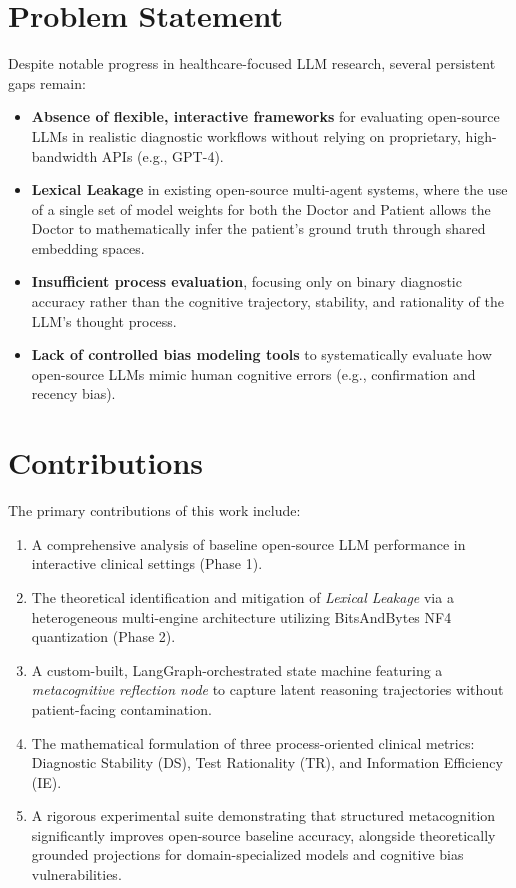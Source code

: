 \documentclass[12pt, a4paper, twoside]{report}
\begin{document}
\section{Problem Statement}
Despite notable progress in healthcare-focused LLM research, several persistent gaps remain:
\begin{itemize}
    \item \textbf{Absence of flexible, interactive frameworks} for evaluating open-source LLMs in realistic diagnostic workflows without relying on proprietary, high-bandwidth APIs (e.g., GPT-4).
    \item \textbf{Lexical Leakage} in existing open-source multi-agent systems, where the use of a single set of model weights for both the Doctor and Patient allows the Doctor to mathematically infer the patient's ground truth through shared embedding spaces.
    \item \textbf{Insufficient process evaluation}, focusing only on binary diagnostic accuracy rather than the cognitive trajectory, stability, and rationality of the LLM's thought process.
    \item \textbf{Lack of controlled bias modeling tools} to systematically evaluate how open-source LLMs mimic human cognitive errors (e.g., confirmation and recency bias).
\end{itemize}

\section{Contributions}
The primary contributions of this work include:
\begin{enumerate}
    \item A comprehensive analysis of baseline open-source LLM performance in interactive clinical settings (Phase 1).
    \item The theoretical identification and mitigation of \textit{Lexical Leakage} via a heterogeneous multi-engine architecture utilizing BitsAndBytes NF4 quantization (Phase 2).
    \item A custom-built, LangGraph-orchestrated state machine featuring a \textit{metacognitive reflection node} to capture latent reasoning trajectories without patient-facing contamination.
    \item The mathematical formulation of three process-oriented clinical metrics: Diagnostic Stability (DS), Test Rationality (TR), and Information Efficiency (IE).
    \item A rigorous experimental suite demonstrating that structured metacognition significantly improves open-source baseline accuracy, alongside theoretically grounded projections for domain-specialized models and cognitive bias vulnerabilities.
\end{enumerate}
\end{document}
